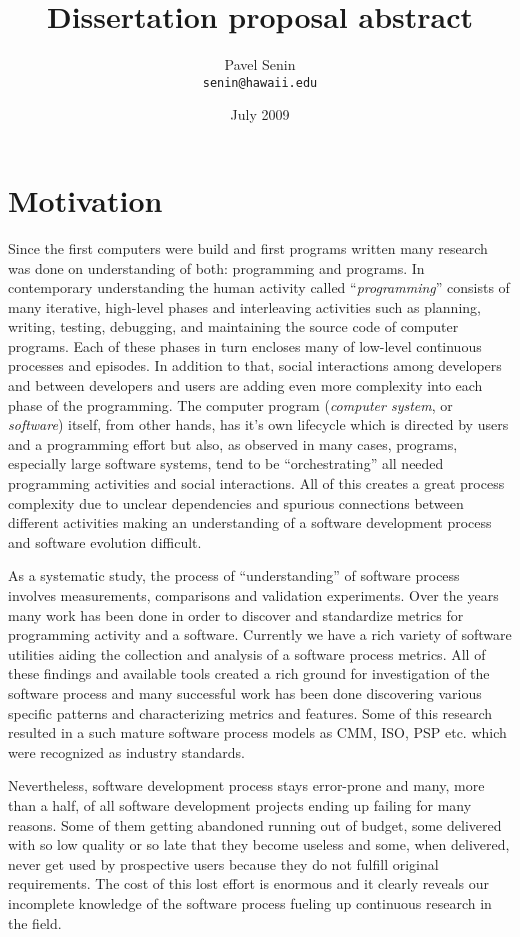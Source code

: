 \documentclass[11pt,oneside]{article}
\begin{document}
\title{Dissertation proposal abstract}
\author{Pavel Senin \\
 \texttt{senin@hawaii.edu}
}
\date{July 2009}
\maketitle

\section{Motivation}
Since the first computers were build and first programs written many research was done on understanding of both: programming and programs. In contemporary understanding the human activity called ``\textit{programming}'' consists of many iterative, high-level phases and interleaving activities such as planning, writing, testing, debugging, and maintaining the source code of computer programs. Each of these phases in turn encloses many of low-level continuous processes and episodes. In addition to that, social interactions among developers and between developers and users are adding even more complexity into each phase of the programming. The computer program (\textit{computer system}, or \textit{software}) itself, from other hands, has it's own lifecycle which is directed by users and a programming effort but also, as observed in many cases, programs, especially large software systems, tend to be ``orchestrating'' all needed programming activities and social interactions. All of this creates a great process complexity due to unclear dependencies and spurious connections between different activities making an understanding of a software development process and software evolution difficult.

As a systematic study, the process of ``understanding'' of software process involves measurements, comparisons and validation experiments. Over the years many work has been done in order to discover and standardize metrics for programming activity and a software. Currently we have a rich variety of software utilities aiding the collection and analysis of a software process metrics. All of these findings and available tools created a rich ground for investigation of the software process and many successful work has been done discovering various specific patterns and characterizing metrics and features. Some of this research resulted in a such mature software process models as CMM, ISO, PSP etc. which were recognized as industry standards.

Nevertheless, software development process stays error-prone and many, more than a half, of all software development projects ending up failing for many reasons. Some of them getting abandoned running out of budget, some delivered with so low quality or so late that they become useless and some, when delivered, never get used by prospective users because they do not fulfill original requirements. The cost of this lost effort is enormous and it clearly reveals our incomplete knowledge of the software process fueling up continuous research in the field. 
\end{document}
